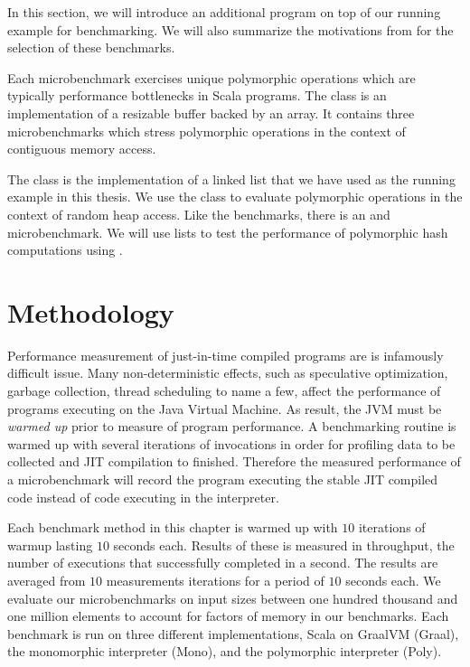 In this section, we will introduce an additional program on top of our running example for benchmarking.
We will also summarize the motivations from \cite{scala:miniboxing} for the selection of these benchmarks.

Each microbenchmark exercises unique polymorphic operations which are typically performance bottlenecks\cite{scala:collections-optimization}\cite{scala:dacapo} in Scala programs.
The  class is an implementation of a resizable buffer backed by an array.
It contains three microbenchmarks which stress polymorphic operations in the context of contiguous memory access.

The  class is the implementation of a linked list that we have used as the running example in this thesis.
We use the  class to evaluate polymorphic operations in the context of random heap access.
Like the  benchmarks, there is an  and  microbenchmark.
We will use lists to test the performance of polymorphic hash computations using .

\section{Methodology}

Performance measurement of just-in-time compiled programs are is infamously difficult issue\cite{java:performance-analysis}\cite{java:statistically-rigor-performance-analysis}.
Many non-deterministic effects, such as speculative optimization, garbage collection, thread scheduling to name a few, affect the performance of programs executing on the Java Virtual Machine.
As result, the JVM must be \textit{warmed up} prior to measure of program performance.
A benchmarking routine is warmed up with several iterations of invocations in order for profiling data to be collected and JIT compilation to finished.
Therefore the measured performance of a microbenchmark will record the program executing the stable JIT compiled code instead of code executing in the interpreter.

Each benchmark method in this chapter is warmed up with $10$ iterations of warmup lasting $10$ seconds each.
Results of these is measured in throughput, the number of executions that successfully completed in a second.
The results are averaged from $10$ measurements iterations for a period of $10$ seconds each.
We evaluate our microbenchmarks on input sizes between one hundred thousand and one million elements to account for factors of memory in our benchmarks. 
Each benchmark is run on three different implementations, Scala on GraalVM (Graal), the monomorphic interpreter (Mono), and the polymorphic interpreter (Poly).

